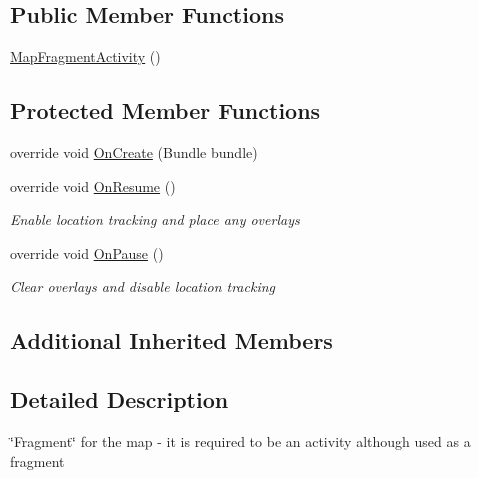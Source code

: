 \subsection*{Public Member Functions}
\begin{DoxyCompactItemize}
\item 
\hyperlink{class_field_service_1_1_android_1_1_map_fragment_activity_aa8c7c0768614a2463555a68304ce1b5c}{Map\+Fragment\+Activity} ()
\end{DoxyCompactItemize}
\subsection*{Protected Member Functions}
\begin{DoxyCompactItemize}
\item 
override void \hyperlink{class_field_service_1_1_android_1_1_map_fragment_activity_a529915b92446363ae82cfe221e285ec1}{On\+Create} (Bundle bundle)
\item 
override void \hyperlink{class_field_service_1_1_android_1_1_map_fragment_activity_a8e02dae6991bf88d7e73bb82fc8b207d}{On\+Resume} ()
\begin{DoxyCompactList}\small\item\em Enable location tracking and place any overlays \end{DoxyCompactList}\item 
override void \hyperlink{class_field_service_1_1_android_1_1_map_fragment_activity_a0f4eb2cf4a2ca4ed8512a22d6b824d19}{On\+Pause} ()
\begin{DoxyCompactList}\small\item\em Clear overlays and disable location tracking \end{DoxyCompactList}\end{DoxyCompactItemize}
\subsection*{Additional Inherited Members}


\subsection{Detailed Description}
\char`\"{}\+Fragment\char`\"{} for the map -\/ it is required to be an activity although used as a fragment 




